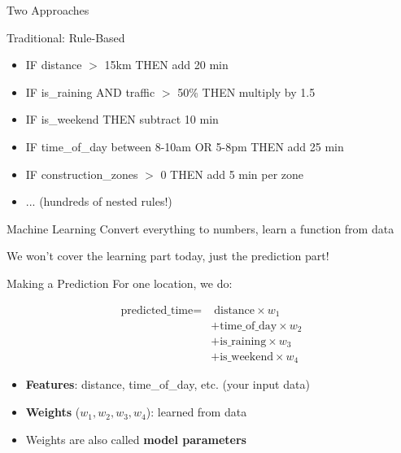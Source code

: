 \documentclass[10pt]{beamer}
\begin{document}
\begin{frame}[fragile]{Two Approaches}
  \begin{block}{Traditional: Rule-Based}
    \small
    \begin{itemize}
      \item IF distance $>$ 15km THEN add 20 min
      \item IF is\_raining AND traffic $>$ 50\% THEN multiply by 1.5
      \item IF is\_weekend THEN subtract 10 min
      \item IF time\_of\_day between 8-10am OR 5-8pm THEN add 25 min
      \item IF construction\_zones $>$ 0 THEN add 5 min per zone
      \item ... (hundreds of nested rules!)
    \end{itemize}
  \end{block}
  
  \vspace{0.5em}
  
  \begin{block}{Machine Learning}
    Convert everything to numbers, learn a function from data
  \end{block}
  
  \vspace{0.5em}
  \small We won't cover the learning part today, just the prediction part!
\end{frame}

\begin{frame}{Making a Prediction}
  For one location, we do:
  
  \vspace{0.5em}
  \begin{align*}
    \text{predicted\_time} = &\; \text{distance} \times w_1 \\
    &+ \text{time\_of\_day} \times w_2 \\
    &+ \text{is\_raining} \times w_3 \\
    &+ \text{is\_weekend} \times w_4
  \end{align*}
  
  \vspace{0.5em}
  \begin{itemize}
    \item \textbf{Features}: distance, time\_of\_day, etc. (your input data)
    \item \textbf{Weights} ($w_1, w_2, w_3, w_4$): learned from data
    \item Weights are also called \textbf{model parameters}
  \end{itemize}
\end{frame}
\end{document}
